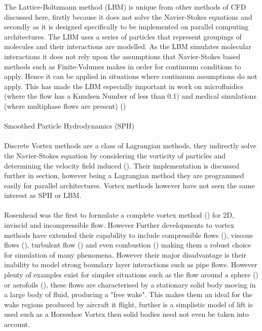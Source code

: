 The Lattice-Boltzmann method (LBM) is unique from other methods of CFD discussed here, firstly because it does not solve the Navier-Stokes equations and secondly as it is designed specifically to be implemented on parallel computing architectures. The LBM uses a series of particles that represent groupings of molecules and their interactions are modelled. As the LBM simulates molecular interactions it does not rely upon the assumptions that Navier-Stokes based methods such as Finite-Volumes makes in order for continuum conditions to apply. Hence it can be applied in situations where continuum assumptions do not apply. This has made the LBM especially important in work on microfluidics (where the flow has a Knudsen Number of less than 0.1) and medical simulations (where multiphase flows are present) (\cite{c4c8c2aa4eea4ba190da55f77965537b})
\\\\
Smoothed Particle Hydrodynamics (SPH)
\\\\
Discrete Vortex methods are a class of Lagrangian methods, they indirectly solve the Navier-Stokes equation by considering the vorticity of particles and determining the velocity field induced (\cite{cottet_koumoutsakos_2008}). Their implementation is discussed further in section, however being a Lagrangian method they are programmed easily for parallel architectures. Vortex methods however have not seen the same interest as SPH or LBM.
\\\\
Rosenhead was the first to formulate a complete vortex method (\cite{rosenhead_1931}) for 2D, inviscid and incompressible flow. However Further developments to vortex methods have extended their capability to include compressible flows (\cite{ELDREDGE2002371}), viscous flows (\cite{BADEN1990278}), turbulent flow (\cite{barba_1996}) and even combustion (\cite{Lakkis2003435}) making them a robust choice for simulation of many phenomena. However their major disadvantage is their inability to model strong boundary layer interactions such as pipe flows. However plenty of examples exist for simpler situations such as the flow around a sphere (\cite{johnson_patel_1999}) or aerofoils (\cite{xu_1999}), these flows are characterised by a stationary solid body moving in a large body of fluid, producing a "free wake". This makes them an ideal for the wake regions produced by aircraft it flight, further is a simplistic model of lift is used such as a Horseshoe Vortex then solid bodies need not even be taken into account.
